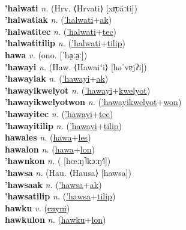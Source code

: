  \label{'hayktilip} \\
\textbf{'halwati} \textit{n.} (Hrv. ⟨Hrvati⟩ [xr̩ʋăːti])
 \label{'halwati} \\
\textbf{'halwatiak} \textit{n.} (\hyperref['halwati]{'halwati}+\hyperref[ak]{ak})
 \label{'halwatiak} \\
\textbf{'halwatitec} \textit{n.} (\hyperref['halwati]{'halwati}+\hyperref[tec]{tec})
 \label{'halwatitec} \\
\textbf{'halwatitilip} \textit{n.} (\hyperref['halwati]{'halwati}+\hyperref[tilip]{tilip})
 \label{'halwatitilip} \\
\textbf{hawa} \textit{v.} (ono. [ˈha̤ːa̤ː])
 \label{hawa} \\
\textbf{'hawayi} \textit{n.} (Haw. ⟨Hawaiʻi⟩ [həˈvɐjʔi])
 \label{'hawayi} \\
\textbf{'hawayiak} \textit{n.} (\hyperref['hawayi]{'hawayi}+\hyperref[ak]{ak})
 \label{'hawayiak} \\
\textbf{'hawayikwelyot} \textit{n.} (\hyperref['hawayi]{'hawayi}+\hyperref[kwelyot]{kwelyot})
 \label{'hawayikwelyot} \\
\textbf{'hawayikwelyotwon} \textit{n.} (\hyperref['hawayikwelyot]{'hawayikwelyot}+\hyperref[won]{won})
 \label{'hawayikwelyotwon} \\
\textbf{'hawayitec} \textit{n.} (\hyperref['hawayi]{'hawayi}+\hyperref[tec]{tec})
 \label{'hawayitec} \\
\textbf{'hawayitilip} \textit{n.} (\hyperref['hawayi]{'hawayi}+\hyperref[tilip]{tilip})
 \label{'hawayitilip} \\
\textbf{hawales} \textit{n.} (\hyperref[hawa]{hawa}+\hyperref[les]{les})
 \label{hawales} \\
\textbf{hawalon} \textit{n.} (\hyperref[hawa]{hawa}+\hyperref[lon]{lon})
 \label{hawalon} \\
\textbf{'hawnkon} \textit{n.} ( [hœːŋ˥kɔːŋ˧˥])
 \label{'hawnkon} \\
\textbf{'hawsa} \textit{n.} (Hau. ⟨Hausa⟩ [hawsa])
 \label{'hawsa} \\
\textbf{'hawsaak} \textit{n.} (\hyperref['hawsa]{'hawsa}+\hyperref[ak]{ak})
 \label{'hawsaak} \\
\textbf{'hawsatilip} \textit{n.} (\hyperref['hawsa]{'hawsa}+\hyperref[tilip]{tilip})
 \label{'hawsatilip} \\
\textbf{hawku} \textit{v.} (\hyperref[cayni]{\sout{cayni}})
 \label{hawku} \\
\textbf{hawkulon} \textit{n.} (\hyperref[hawku]{hawku}+\hyperref[lon]{lon})
